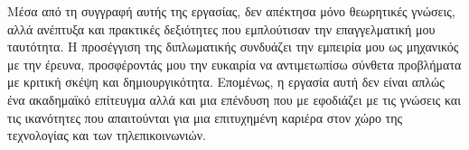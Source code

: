 Μέσα από τη συγγραφή αυτής της εργασίας, δεν απέκτησα μόνο θεωρητικές γνώσεις, αλλά ανέπτυξα και πρακτικές δεξιότητες που εμπλούτισαν την 
επαγγελματική μου ταυτότητα. Η προσέγγιση της διπλωματικής συνδυάζει την εμπειρία μου ως μηχανικός με την έρευνα, προσφέροντάς μου την ευκαιρία να 
αντιμετωπίσω σύνθετα προβλήματα με κριτική σκέψη και δημιουργικότητα. Επομένως, η εργασία αυτή δεν είναι απλώς ένα ακαδημαϊκό επίτευγμα αλλά και μια 
επένδυση που με εφοδιάζει με τις γνώσεις και τις ικανότητες που απαιτούνται για μια επιτυχημένη καριέρα στον χώρο της τεχνολογίας και των τηλεπικοινωνιών.